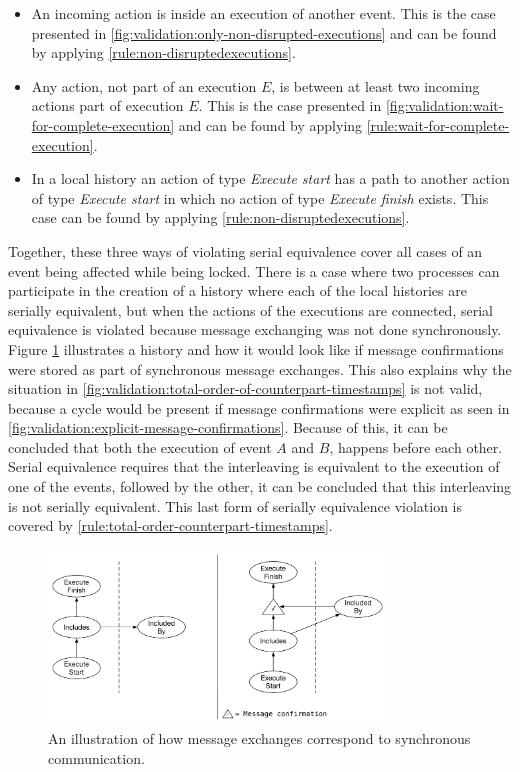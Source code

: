 	\begin{itemize}
		\item An incoming action is inside an execution of another event. This is the case presented in \autoref{fig:validation:only-non-disrupted-executions} and can be found by applying \autoref{rule:non-disruptedexecutions}.
		\item Any action, not part of an execution $E$, is between at least two incoming actions part of execution $E$. This is the case presented in \autoref{fig:validation:wait-for-complete-execution} and can be found by applying \autoref{rule:wait-for-complete-execution}.
		\item In a local history an action of type \textit{Execute start} has a path to another action of type \textit{Execute start} in which no action of type \textit{Execute finish} exists. This case can be found by applying \autoref{rule:non-disruptedexecutions}.
	\end{itemize}
	
	\noindent Together, these three ways of violating serial equivalence cover all cases of an event being affected while being locked. There is a case where two processes can participate in the creation of a history where each of the local histories are serially equivalent, but when the actions of the executions are connected, serial equivalence is violated because message exchanging was not done synchronously. Figure \ref{fig:validation:synchronous-execution} illustrates a history and how it would look like if message confirmations were stored as part of synchronous message exchanges. This also explains why the situation in \autoref{fig:validation:total-order-of-counterpart-timestamps} is not valid, because a cycle would be present if message confirmations were explicit as seen in \autoref{fig:validation:explicit-message-confirmations}. Because of this, it can be concluded that both the execution of event $A$ and $B$, happens before each other. Serial equivalence requires that the interleaving is equivalent to the execution of one of the events, followed by the other, it can be concluded that this interleaving is not serially equivalent. This last form of serially equivalence violation is covered by \autoref{rule:total-order-counterpart-timestamps}.
	
	\begin{figure}[H]
		\centering
		\includegraphics[width=0.8\textwidth]{6validation/images/synchronous-execution.pdf}
		\caption{An illustration of how message exchanges correspond to synchronous communication.}
		\label{fig:validation:synchronous-execution}
	\end{figure}
	
